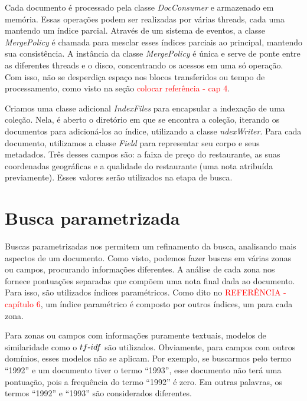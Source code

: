 Cada documento é processado pela classe \emph{DocConsumer} e armazenado em memória. Essas operações podem ser realizadas por várias threads, cada uma mantendo um índice parcial. Através de um sistema de eventos, a classe \emph{MergePolicy} é chamada para mesclar esses índices parciais ao principal, mantendo sua consistência. A instância da classe \emph{MergePolicy} é única e serve de ponte entre as diferentes threads e o disco, concentrando os acessos em uma só operação. Com isso, não se desperdiça espaço nos blocos transferidos ou tempo de processamento, como visto na seção \textcolor{red}{colocar referência - cap 4}. 

Criamos uma classe adicional \emph{IndexFiles} para encapsular a indexação de uma coleção. Nela, é aberto o diretório em que se encontra a coleção, iterando os documentos para adicioná-los ao índice, utilizando a classe \emph{ndexWriter}. Para cada documento, utilizamos a classe \emph{Field} para representar seu corpo e seus metadados. Três desses campos são: a faixa de preço do restaurante, as suas coordenadas geográficas e a qualidade do restaurante (uma nota atribuída previamente). Esses valores serão utilizados na etapa de busca.

\section{Busca parametrizada}
\label{sec:busca_parametrizada}

Buscas parametrizadas nos permitem um refinamento da busca, analisando mais aspectos de um documento. Como visto, podemos fazer buscas em várias zonas ou campos, procurando informações diferentes. A análise de cada zona nos fornece pontuações separadas que compõem uma nota final dada ao documento. Para isso, são utilizados índices paramétricos. Como dito no \textcolor{red}{REFERÊNCIA - capítulo 6}, um índice paramétrico é composto por outros índices, um para cada zona.

Para zonas ou campos com informações puramente textuais, modelos de similaridade como o $tf\textnormal{-}idf$ são utilizados. Obviamente, para campos com outros domínios, esses modelos não se aplicam. Por exemplo, se buscarmos pelo termo ``1992'' e um documento tiver o termo ``1993'', esse documento não terá uma pontuação, pois a frequência do termo ``1992'' é zero.  Em outras palavras, os termos ``1992'' e ``1993'' são considerados diferentes.

